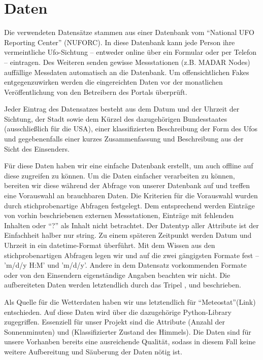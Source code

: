\section{Daten} \label{data}

Die verwendeten Datensätze stammen aus einer Datenbank vom \enquote{National UFO Reporting Center} (NUFORC). In diese Datenbank kann jede Person ihre vermeintliche Ufo-Sichtung -- entweder online über ein Formular oder per Telefon -- eintragen. Des Weiteren senden gewisse Messstationen (z.B. MADAR Nodes) auffällige Messdaten automatisch an die Datenbank. Um offensichtlichen Fakes entgegenzuwirken werden die eingereichten Daten vor der monatlichen Veröffentlichung von den Betreibern des Portals überprüft.

Jeder Eintrag des Datensatzes besteht aus dem Datum und der Uhrzeit der Sichtung, der Stadt sowie dem Kürzel des dazugehörigen Bundesstaates (ausschließlich für die USA), einer klassifizierten Beschreibung der Form des Ufos und gegebenenfalls einer kurzes Zusammenfassung und Beschreibung aus der Sicht des Einsenders.

Für diese Daten haben wir eine einfache Datenbank erstellt, um auch offline auf diese zugreifen zu können. Um die Daten einfacher verarbeiten zu können, bereiten wir diese während der Abfrage von unserer Datenbank auf und treffen eine Vorauswahl an brauchbaren Daten. Die Kriterien für die Vorauswahl wurden durch stichprobenartige Abfragen festgelegt. Dem entsprechend werden Einträge von vorhin beschriebenen externen Messstationen, Einträge mit fehlenden Inhalten oder \enquote{?} als Inhalt nicht betrachtet. Der Datentyp aller Attribute ist der Einfachheit halber nur string. Zu einem späteren Zeitpunkt werden Datum und Uhrzeit in ein datetime-Format überführt. Mit dem Wissen aus den stichprobenartigen Abfragen legen wir und auf die zwei gängigsten Formate fest -- 'm/d/y H:M' und 'm/d/y'. Andere in dem Datensatz vorkommenden Formate oder von den Einsendern eigenständige Angaben beachten wir nicht. Die aufbereiteten Daten werden letztendlich durch das Tripel ,  und  beschrieben.

Als Quelle für die Wetterdaten haben wir uns letztendlich für \enquote{Meteostat}(Link) entschieden. Auf diese Daten wird über die dazugehörige Python-Library zugegriffen. Essenziell für unser Projekt sind die Attribute  (Anzahl der Sonnenminuten) und  (Klassifizierter Zustand des Himmels). Die Daten sind für unsere Vorhanben bereits eine ausreichende Qualität, sodass in diesem Fall keine weitere Aufbereitung und Säuberung der Daten nötig ist.

